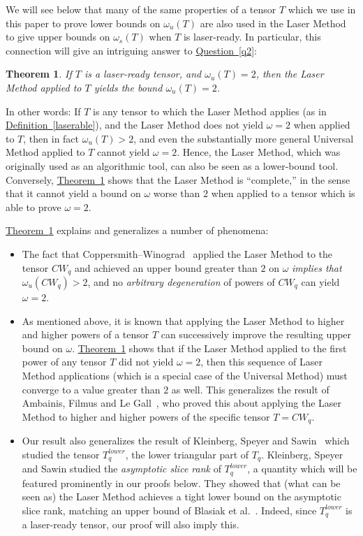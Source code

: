 \documentclass[11pt]{article}
\numberwithin{equation}{section}
\newtheorem{theorem}{Theorem}[section]
\theoremstyle{definition}
\theoremstyle{plain}
\newcommand{\expref}[2]{\hyperref[#2]{#1~\ref{#2}}}
\theoremstyle{definition}
\begin{document}
We will see below that many of the same properties of a tensor $T$ which we use in this paper to prove lower bounds on $\omega_u(T)$ are also used in the Laser Method to give upper bounds on $\omega_s(T)$ when $T$ is laser-ready. In particular, this connection will give an intriguing answer to \expref{Question}{q2}:

\begin{theorem} \label{introlaseropt}
If $T$ is a laser-ready tensor, and $\omega_u(T) = 2$, then the Laser Method applied to $T$ yields the bound $\omega_u(T) = 2$.
\end{theorem}

In other words: If $T$ is any tensor to which the Laser Method applies (as in \expref{Definition}{laserable}), and the Laser Method does not yield $\omega=2$ when applied to $T$, then in fact $\omega_u(T)>2$, and even the substantially more general Universal Method applied to $T$ cannot yield $\omega=2$. Hence, the Laser Method, which was originally used as an algorithmic tool, can also be seen as a 
%
lower-bound   %
tool. Conversely, \expref{Theorem}{introlaseropt} shows that the Laser Method is ``complete,'' in the sense that it cannot yield a bound on $\omega$ worse than $2$ when applied to a tensor which is able to prove $\omega=2$.

\expref{Theorem}{introlaseropt} explains and generalizes a number of phenomena:
\begin{itemize}
    \item The fact that Coppersmith--Winograd~\cite{coppersmith} applied the Laser Method to the tensor $CW_q$ and achieved an upper bound greater than $2$ on $\omega$ \emph{implies that} $\omega_u(CW_q) > 2$, and no \emph{arbitrary degeneration} of powers of $CW_q$ can yield $\omega = 2$.
    
    \item As mentioned above, it is known that applying the Laser Method to higher and higher powers of a tensor $T$ can successively improve the resulting upper bound on $\omega$. \expref{Theorem}{introlaseropt} shows that if the Laser Method applied to the first power of any tensor $T$ did not yield $\omega=2$, then this sequence of Laser Method applications (which is a special case of the Universal Method) must converge to a value greater than $2$ as well. This generalizes the result of Ambainis, Filmus and Le Gall~\cite{ambainis}, who proved this about applying the Laser Method to higher and higher powers of the specific tensor $T = CW_q$.
    
    \item Our result also generalizes the result of Kleinberg, Speyer and Sawin~\cite{kleinberg} which studied the tensor $T_q^{lower}$, the lower triangular part of $T_q$. Kleinberg, Speyer and Sawin studied the \emph{asymptotic slice rank} of $T_q^{lower}$, a quantity which will be featured prominently in our proofs below. They showed that (what can be seen as) the Laser Method achieves a tight lower bound on the asymptotic slice rank, matching an upper bound of Blasiak et al.~\cite{blasiak}. Indeed, since $T_q^{lower}$ is a laser-ready tensor, our proof will also imply this.
\end{itemize}
\end{document}
